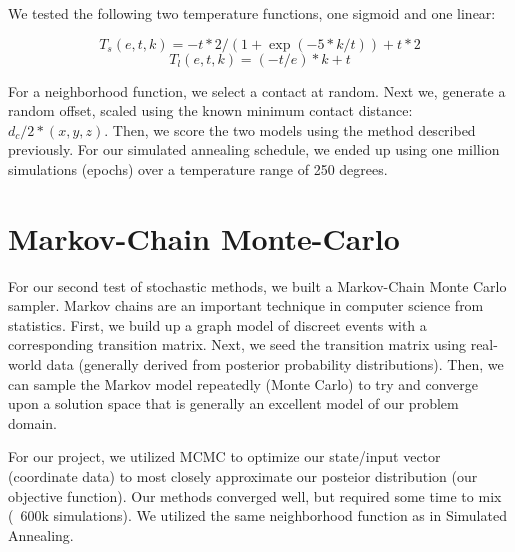 \documentclass{article}
\begin{document}
We tested the following two temperature functions, one sigmoid and one linear:

\begin{equation}
      T_s(e,t,k) =  -t*2/(1 + \exp(-5*k/t)) + t*2
    \end{equation}
\begin{equation}
      T_l(e,t,k) =  (-t/e)*k + t
    \end{equation}
    
For a neighborhood function, we select a contact at random.  Next we, generate a random offset, scaled using the known minimum contact distance: $d_{c}/2*(x,y,z)$.  Then, we score the two models using the method described previously.  For our simulated annealing schedule, we ended up using one million simulations (epochs) over a temperature range of 250 degrees.

\section{Markov-Chain Monte-Carlo}

For our second test of stochastic methods, we built a Markov-Chain Monte Carlo sampler.  Markov chains are an important technique in computer science from statistics.  First, we build up a graph model of discreet events with a corresponding transition matrix.  Next, we seed the transition matrix using real-world data (generally derived from posterior probability distributions).  Then, we can sample the Markov model repeatedly (Monte Carlo) to try and converge upon a solution space that is generally an excellent model of our problem domain.

For our project, we utilized MCMC to optimize our state/input vector (coordinate data) to most closely approximate our posteior distribution (our objective function).  Our methods converged well, but required some time to mix (~600k simulations).  We utilized the same neighborhood function as in Simulated Annealing.
\end{document}
